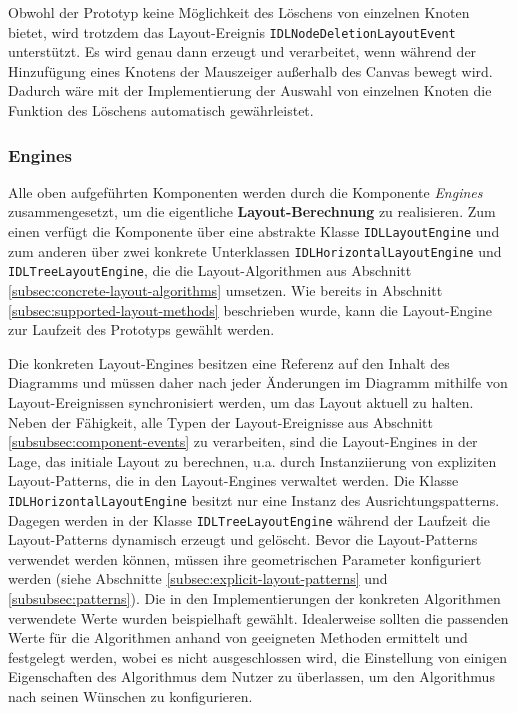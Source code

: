 Obwohl der Prototyp keine Möglichkeit des Löschens von einzelnen Knoten bietet, wird trotzdem das Layout-Ereignis \texttt{IDLNodeDeletionLayoutEvent} unterstützt. Es wird genau dann erzeugt und verarbeitet, wenn während der Hinzufügung eines Knotens der Mauszeiger außerhalb des Canvas bewegt wird. Dadurch wäre mit der Implementierung der Auswahl von einzelnen Knoten die Funktion des Löschens automatisch gewährleistet.

\subsubsection{Engines}
\label{subsubsec:component-engines}

Alle oben aufgeführten Komponenten werden durch die Komponente \textit{Engines} zusammengesetzt, um die eigentliche \textbf{Layout-Berechnung} zu realisieren. Zum einen verfügt die Komponente über eine abstrakte Klasse \texttt{IDLLayoutEngine} und zum anderen über zwei konkrete Unterklassen \texttt{IDLHorizontalLayoutEngine} und \texttt{IDLTreeLayoutEngine}, die die Layout-Algorithmen aus Abschnitt \ref{subsec:concrete-layout-algorithms} umsetzen. Wie bereits in Abschnitt \ref{subsec:supported-layout-methods} beschrieben wurde, kann die Layout-Engine zur Laufzeit des Prototyps gewählt werden.

Die konkreten Layout-Engines besitzen eine Referenz auf den Inhalt des Diagramms und müssen daher nach jeder Änderungen im Diagramm mithilfe von Layout-Ereignissen synchronisiert werden, um das Layout aktuell zu halten. Neben der Fähigkeit, alle Typen der Layout-Ereignisse aus Abschnitt \ref{subsubsec:component-events} zu verarbeiten, sind die Layout-Engines in der Lage, das initiale Layout zu berechnen, u.a. durch Instanziierung von expliziten Layout-Patterns, die in den Layout-Engines verwaltet werden. Die Klasse \texttt{IDLHorizontalLayoutEngine} besitzt nur eine Instanz des Ausrichtungspatterns. Dagegen werden in der Klasse \texttt{IDLTreeLayoutEngine} während der Laufzeit die Layout-Patterns dynamisch erzeugt und gelöscht. Bevor die Layout-Patterns verwendet werden können, müssen ihre geometrischen Parameter konfiguriert werden (siehe Abschnitte \ref{subsec:explicit-layout-patterns} und \ref{subsubsec:patterns}). Die in den Implementierungen der konkreten Algorithmen verwendete Werte wurden beispielhaft gewählt. Idealerweise sollten die passenden Werte für die Algorithmen anhand von geeigneten Methoden ermittelt und festgelegt werden, wobei es nicht ausgeschlossen wird, die Einstellung von einigen Eigenschaften des Algorithmus dem Nutzer zu überlassen, um den Algorithmus nach seinen Wünschen zu konfigurieren.

